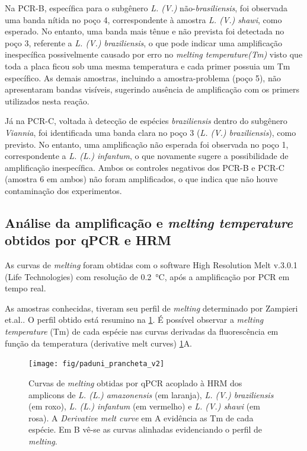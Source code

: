 
Na PCR-B, específica para o subgênero \textit{L. (V.)} não-\textit{brasiliensis}, foi observada uma banda nítida no poço 4, correspondente à amostra \textit{L. (V.) shawi}, como esperado. 
No entanto, uma banda mais tênue e não prevista foi detectada no poço 3, referente a \textit{L. (V.) braziliensis}, o que pode indicar uma amplificação inespecífica possivelmente causado
por erro no \textit{melting temperature(Tm)} visto que toda a placa ficou sob uma mesma temperatura e cada primer possuia um Tm específico. As demais amostras, incluindo a amostra-problema 
(poço 5), não apresentaram bandas visíveis, sugerindo ausência de amplificação com os primers utilizados nesta reação.

Já na PCR-C, voltada à detecção de espécies \textit{braziliensis} dentro do
subgênero \textit{Viannia}, foi identificada uma banda clara no poço 3 (\textit{L. (V.) braziliensis}), 
como previsto. No entanto, uma amplificação não esperada foi observada no poço 1, correspondente a \textit{L. (L.) infantum},  o que novamente sugere a possibilidade de amplificação inespecífica.
Ambos os controles negativos dos PCR-B e PCR-C (amostra 6 em ambos) não foram amplificados, o que indica que não houve contaminação dos experimentos.

\subsection{Análise da amplificação e \textit{melting temperature} obtidos por
qPCR e HRM}

As curvas de \textit{melting} foram obtidas com o software High
Resolution Melt v.3.0.1 (Life Technologies) com resolução de
\qty{0,2}{\celsius}, após a amplificação por PCR em tempo real.

As amostras conhecidas, tiveram seu perfil de \textit{melting} determinado por
Zampieri et.al.\cite{HRMzampi2016}. O perfil obtido está resumino na
\cref{paduni}.  É possível observar a \textit{melting temperature} (Tm) de cada
espécie nas curvas derivadas da fluorescência em função da temperatura
(derivative melt curves) \cref{paduni}A.

\begin{figure}[h]
        \centering
        \texttt{[image: fig/paduni\_prancheta\_v2]}
        \caption{Curvas de \textit{melting} obtidas por qPCR acoplado à HRM dos amplicons de \textit{L. (L.)
        amazonensis} (em laranja), \textit{L. (V.) braziliensis} (em roxo),
    \textit{L. (L.) infantum} (em vermelho) e \textit{L. (V.) shawi} (em rosa).
A \textit{Derivative melt curve} em A evidência as Tm de cada espécie. Em B
vê-se as curvas alinhadas evidenciando o perfil de \textit{melting}.}
        \label{paduni}
\end{figure} 

